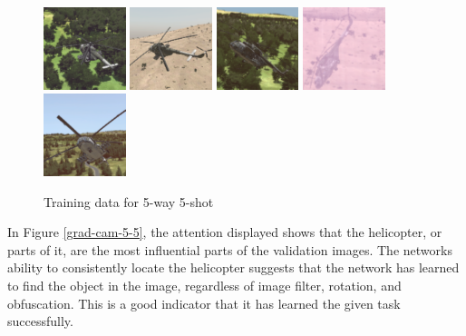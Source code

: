 \begin{figure}[H]
\centering
\subcaptionbox{}
  {\includegraphics[height=2.4cm, width=2.4cm]{images/vbs3/gradcam/5-5/train/Test_Images-1.png}}
\subcaptionbox{}
  {\includegraphics[height=2.4cm, width=2.4cm]{images/vbs3/gradcam/5-5/train/Test_Images-2.png}}
\subcaptionbox{}
  {\includegraphics[height=2.4cm, width=2.4cm]{images/vbs3/gradcam/5-5/train/Test_Images-3.png}}
\subcaptionbox{}
  {\includegraphics[height=2.4cm, width=2.4cm]{images/vbs3/gradcam/5-5/train/Test_Images-4.png}}
\subcaptionbox{}
  {\includegraphics[height=2.4cm, width=2.4cm]{images/vbs3/gradcam/5-5/train/Test_Images-5.png}}
\caption{Training data for 5-way 5-shot}
\label{grad-cam-training-5-5}  
\end{figure}

In Figure \ref{grad-cam-5-5}, the attention displayed shows that the helicopter, or parts of it, are the most influential parts of the validation images. The networks ability to consistently locate the helicopter suggests that the network has learned to find the object in the image, regardless of image filter, rotation, and obfuscation. This is a good indicator that it has learned the given task successfully.

